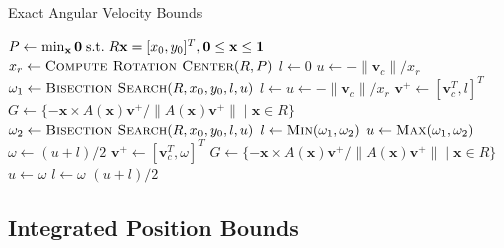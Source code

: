 \documentclass[conference]{IEEEtran}
\makeatletter
\def\BState{\State\hskip-\ALG@thistlm}
\makeatother
\begin{document}
\begin{algorithm}
\caption{Exact Angular Velocity Bounds}\label{alg:angular-velocity-bounds}
\begin{algorithmic}[1]
 \Return {$[0,0]$}
\EndIf
\State $P \gets \min_\mathbf{x} \mathbf{0} \text{\;s.t.\;} R\mathbf{x} = [x_0,y_0]^T,  \mathbf{0} \leq \mathbf{x} \leq \mathbf{1}$
\State $x_r \gets \Call{Compute Rotation Center}{R,P}$
\State $l \gets 0$
\State $u \gets -\lVert\mathbf{v}_c\rVert/x_r$
\State $\omega_1 \gets \Call{Bisection Search}{R,x_0,y_0,l,u}$
\State $l \gets u \gets -\lVert\mathbf{v}_c\rVert/x_r$
\Do%
\State $\mathbf{v}^+ \gets [\mathbf{v}_c^T, l]^T$
\State $G \gets \{-\mathbf{x}\times A(\mathbf{x})\mathbf{v}^+ / \lVert A(\mathbf{x})\mathbf{v}^+ \rVert \;|\; \mathbf{x} \in R\}$
\State $\omega_2 \gets \Call{Bisection Search}{R,x_0,y_0,l,u}$
\State $l \gets \Call{Min}{\omega_1,\omega_2}$
\State $u \gets \Call{Max}{\omega_1,\omega_2}$
\State \Return {$[l, u]$}
\EndFunction
% 
\State $\omega \gets (u+l)/2$
\State $\mathbf{v}^+ \gets [\mathbf{v}_c^T, \omega]^T$
\State $G \gets \{-\mathbf{x}\times A(\mathbf{x})\mathbf{v}^+ / \lVert A(\mathbf{x})\mathbf{v}^+ \rVert \;|\; \mathbf{x} \in R\}$
\State $u \gets \omega$
\Else{} 
\State $l \gets \omega$
\EndIf
\EndWhile
\State \Return $(u+l)/2$
\EndFunction
\end{algorithmic}
\end{algorithm}

\subsection{Integrated Position Bounds}\label{sec:cop-bounds}
\end{document}
